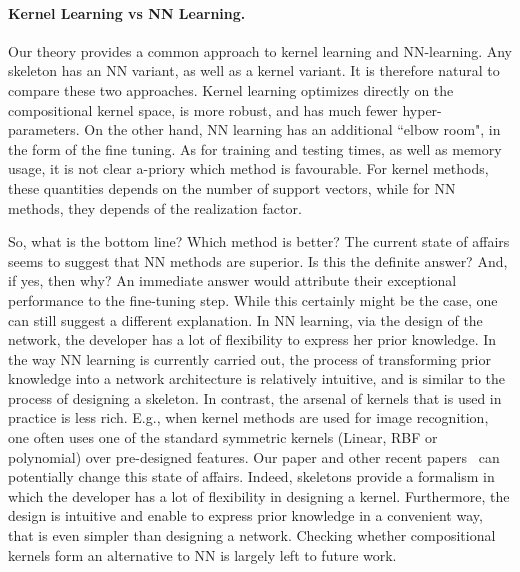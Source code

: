 \paragraph{Kernel Learning vs NN Learning.} Our theory provides a common
approach to kernel learning and NN-learning. Any skeleton has an NN variant,
as well as a kernel variant. It is therefore natural to compare these two
approaches. Kernel learning optimizes directly on the compositional kernel
space, is more robust, and has much fewer hyper-parameters. On the other hand,
NN learning has an additional ``elbow room", in the form of the fine tuning.
As for training and testing times, as well as memory usage, it is not clear
a-priory which method is favourable. For kernel methods, these quantities
depends on the number of support vectors, while for NN methods, they depends
of the realization factor.

So, what is the bottom line? Which method is better? The current state of
affairs seems to suggest that NN methods are superior. Is this the definite
answer? And, if yes, then why?  An immediate answer would attribute their
exceptional performance to the fine-tuning step. While this certainly might be
the case, one can still suggest a different explanation. In NN learning, via
the design of the network, the developer has a lot of flexibility to express
her prior knowledge. In the way NN learning is currently carried out, the
process of transforming prior knowledge into a network architecture is
relatively intuitive, and is similar to the process of designing a skeleton.
In contrast, the arsenal of kernels that is used in practice is less rich.
E.g., when kernel methods are used for image recognition, one often uses one
of the standard symmetric kernels (Linear, RBF or polynomial) over
pre-designed features. Our paper and other recent papers~\cite{strobl2013deep,
bo2011object, mairal2014convolutional, cho2009kernel} can potentially change
this state of affairs. Indeed, skeletons provide a formalism in which the
developer has a lot of flexibility in designing a kernel. Furthermore, the
design is intuitive and enable to express prior knowledge in a convenient way,
that is even simpler than designing a network. Checking whether compositional
kernels form an alternative to NN is largely left to future work.


